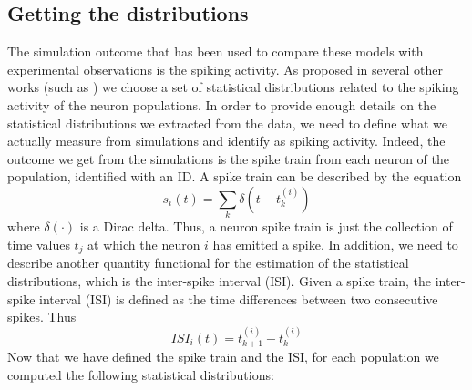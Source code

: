 \documentclass[a4paper, 12pt, twoside, openright]{book}
\begin{document}
\subsection{Getting the distributions}
\label{sec:KDE-EMD}
The simulation outcome that has been used to compare these models with experimental observations is the spiking activity. As proposed in several other works (such as \cite{VanAlbada2018, Knight2018, Dasbach2021, Heittmann2022}) we choose a set of statistical distributions related to the spiking activity of the neuron populations. In order to provide enough details on the statistical distributions we extracted from the data, we need to define what we actually measure from simulations and identify as spiking activity. Indeed, the outcome we get from the simulations is the spike train from each neuron of the population, identified with an ID. A spike train can be described by the equation
\begin{equation}
    \label{eq:spike_train}
    s_i(t)=\sum_k \delta (t-t_k^{(i)}) 
\end{equation}
where $\delta (\cdot)$ is a Dirac delta. Thus, a neuron spike train is just the collection of time values $t_j$ at which the neuron $i$ has emitted a spike. In addition, we need to describe another quantity functional for the estimation of the statistical distributions, which is the inter-spike interval (ISI). Given a spike train, the inter-spike interval (ISI) is defined as the time differences between two consecutive spikes. Thus
\begin{equation}
    ISI_i (t) = t_{k+1}^{(i)} - t_k^{(i)}
\end{equation}
Now that we have defined the spike train and the ISI, for each population we computed the following statistical distributions:
\end{document}
